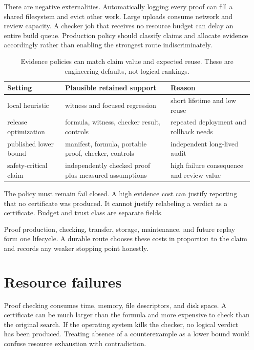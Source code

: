 There are negative externalities. Automatically logging every proof can fill
a shared filesystem and evict other work. Large uploads consume network and
review capacity. A checker job that receives no resource budget can delay an
entire build queue. Production policy should classify claims and allocate
evidence accordingly rather than enabling the strongest route indiscriminately.

\begin{table}[htbp]
\centering
\caption{Evidence policies can match claim value and expected reuse. These are
engineering defaults, not logical rankings.}
\begin{tabular}{@{}p{}p{}p{}@{}}
\toprule
Setting & Plausible retained support & Reason \\
\midrule
local heuristic & witness and focused regression & short lifetime and low reuse \\
release optimization & formula, witness, checker result, controls & repeated deployment and rollback needs \\
published lower bound & manifest, formula, portable proof, checker, controls & independent long-lived audit \\
safety-critical claim & independently checked proof plus measured assumptions & high failure consequence and review value \\
\bottomrule
\end{tabular}
\label{tab:evidence-economics}
\end{table}

The policy must remain fail closed. A high evidence cost can justify reporting
that no certificate was produced. It cannot justify relabeling a verdict as a
certificate. Budget and trust class are separate fields.

\begin{archive}[title={Evidence is an engineered product}]
Proof production, checking, transfer, storage, maintenance, and future replay
form one lifecycle. A durable route chooses these costs in proportion to the
claim and records any weaker stopping point honestly.
\end{archive}

\section{Resource failures}

Proof checking consumes time, memory, file descriptors, and disk space. A
certificate can be much larger than the formula and more expensive to check
than the original search. If the operating system kills the checker, no
logical verdict has been produced. Treating absence of a counterexample as a
lower bound would confuse resource exhaustion with contradiction.

